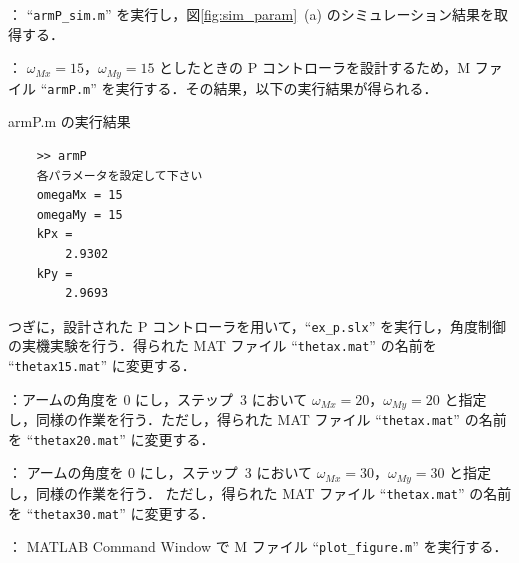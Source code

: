 \vspace{1em}

\noindent
{}： ``\texttt{armP\_sim.m}'' を実行し，図\ref{fig:sim_param}~(a) のシミュレーション結果を取得する．

\vspace{1em}
\noindent
{}：
$\omega_{Mx} = 15$，$\omega_{My} = 15$ としたときの P コントローラを設計するため，M ファイル ``\texttt{armP.m}'' を実行する．その結果，以下の実行結果が得られる．
\newpage

{armP.m} の実行結果
    \begin{verbatim}
    >> armP
    各パラメータを設定して下さい
    omegaMx = 15
    omegaMy = 15
    kPx = 
        2.9302
    kPy = 
        2.9693
    \end{verbatim}
\noindent
つぎに，設計された P コントローラを用いて，``\texttt{ex\_p.slx}'' を実行し，角度制御の実機実験を行う．得られた MAT ファイル ``\texttt{thetax.mat}'' の名前を ``\texttt{thetax15.mat}'' に変更する．

\noindent
{}：アームの角度を 0 にし，ステップ~3 において $\omega_{Mx} = 20$，$\omega_{My} = 20$ と指定し，同様の作業を行う．ただし，得られた MAT ファイル “\texttt{thetax.mat}” の名前を “\texttt{thetax20.mat}” に変更する．

\noindent
{}：
アームの角度を 0 にし，ステップ~3 において $\omega_{Mx} = 30$，$\omega_{My} = 30$ と指定し，同様の作業を行う．
ただし，得られた MAT ファイル “\texttt{thetax.mat}” の名前を “\texttt{thetax30.mat}” に変更する．

\noindent
{}：
MATLAB Command Window で M ファイル ``\texttt{plot\_figure.m}'' を実行する．

